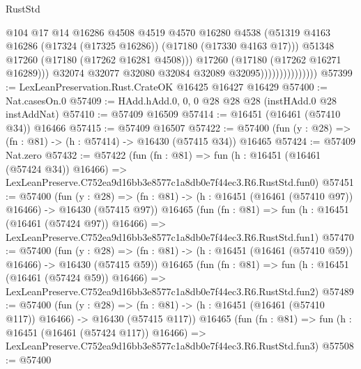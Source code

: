 \begin{lexlean}{RustStd}
\begin{coremodule}
                                      @104
                                      @17
                                      @14
                                      @16286
                                      @4508
                                      @4519
                                      @4570
                                      @16280
                                      @4538
                                      (@51319
                                        @4163
                                        @16286
                                        (@17324 (@17325 @16286))
                                        (@17180 (@17330 @4163 @17)))
                                      @51348
                                      @17260
                                      (@17180 (@17262 @16281 @4508)))
                                    @17260
                                    (@17180 (@17262 @16271 @16289)))
                                  @32074
                                  @32077
                                  @32080
                                  @32084
                                  @32089
                                  @32095)))))))))))))))
@57399 := LexLeanPreservation.Rust.CrateOK @16425 @16427 @16429
@57400 := Nat.casesOn.{0}
@57409 := HAdd.hAdd.{0, 0, 0} @28 @28 @28 (instHAdd.{0} @28 instAddNat)
@57410 := @57409 @16509
@57414 := @16451 (@16461 (@57410 @34)) @16466
@57415 := @57409 @16507
@57422 := @57400 (fun (y : @28) => (fn : @81) -> (h : @57414) -> @16430 (@57415 @34)) @16465
@57424 := @57409 Nat.zero
@57432 := @57422
    (fun (fn : @81) =>
    fun (h : @16451 (@16461 (@57424 @34)) @16466) =>
    LexLeanPreserve.C752ea9d16bb3e8577c1a8db0e7f44ec3.R6.RustStd.fun0)
@57451 := @57400
    (fun (y : @28) =>
    (fn : @81) -> (h : @16451 (@16461 (@57410 @97)) @16466) -> @16430 (@57415 @97))
    @16465
    (fun (fn : @81) =>
    fun (h : @16451 (@16461 (@57424 @97)) @16466) =>
    LexLeanPreserve.C752ea9d16bb3e8577c1a8db0e7f44ec3.R6.RustStd.fun1)
@57470 := @57400
    (fun (y : @28) =>
    (fn : @81) -> (h : @16451 (@16461 (@57410 @59)) @16466) -> @16430 (@57415 @59))
    @16465
    (fun (fn : @81) =>
    fun (h : @16451 (@16461 (@57424 @59)) @16466) =>
    LexLeanPreserve.C752ea9d16bb3e8577c1a8db0e7f44ec3.R6.RustStd.fun2)
@57489 := @57400
    (fun (y : @28) =>
    (fn : @81) -> (h : @16451 (@16461 (@57410 @117)) @16466) -> @16430 (@57415 @117))
    @16465
    (fun (fn : @81) =>
    fun (h : @16451 (@16461 (@57424 @117)) @16466) =>
    LexLeanPreserve.C752ea9d16bb3e8577c1a8db0e7f44ec3.R6.RustStd.fun3)
@57508 := @57400

\end{coremodule}
\end{lexlean}
